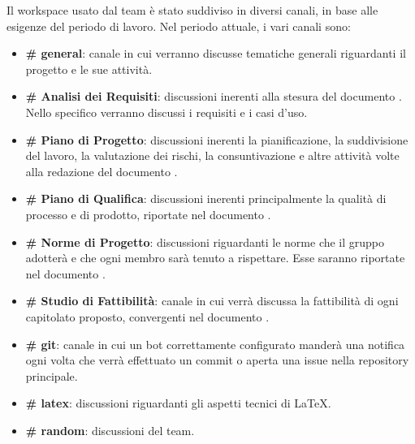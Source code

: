 			Il workspace usato dal team è stato suddiviso in diversi canali, in base alle esigenze del periodo di lavoro. Nel periodo attuale, i vari canali sono:
			\begin{itemize}
				\item \textbf{\# general}: canale in cui verranno discusse tematiche generali riguardanti il progetto e le sue attività.
				\item \textbf{\# Analisi dei Requisiti}: discussioni inerenti alla stesura del documento . Nello specifico verranno discussi
					 i requisiti e i casi d'uso.
				\item \textbf{\# Piano di Progetto}: discussioni inerenti la pianificazione, la suddivisione del lavoro, la valutazione dei rischi, la consuntivazione e
					altre attività volte alla redazione del documento .
				\item \textbf{\# Piano di Qualifica}: discussioni inerenti principalmente la qualità di processo e di prodotto, riportate nel documento .
				\item \textbf{\# Norme di Progetto}: discussioni riguardanti le norme che il gruppo adotterà e che ogni membro sarà tenuto a rispettare. Esse
					saranno riportate nel documento .
				\item \textbf{\# Studio di Fattibilità}: canale in cui verrà discussa la fattibilità di ogni capitolato proposto, convergenti nel documento
					.
				\item \textbf{\# git}: canale in cui un bot correttamente configurato manderà una notifica ogni volta che verrà effettuato un commit o aperta una issue
					nella repository principale.
				\item \textbf{\# latex}: discussioni riguardanti gli aspetti tecnici di \LaTeX.
				\item \textbf{\# random}: discussioni  del team.
			\end{itemize}


